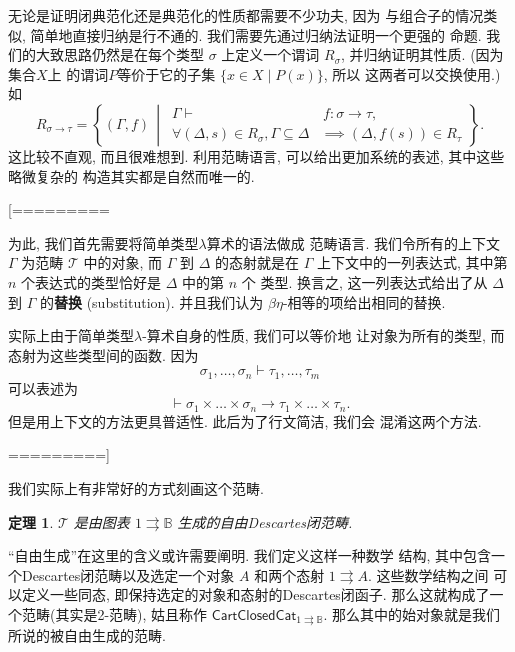 \documentclass[UTF8]{ctexbook}
\theoremstyle{plain}
\newtheorem{theorem}{定理}[chapter]
\theoremstyle{definition}
\theoremstyle{remark}
\begin{document}
无论是证明闭典范化还是典范化的性质都需要不少功夫, 因为
与组合子的情况类似, 简单地直接归纳是行不通的.
我们需要先通过归纳法证明一个更强的
命题. 我们的大致思路仍然是在每个类型 \(\sigma\) 上定义一个谓词
\(R_\sigma\), 并归纳证明其性质. (因为集合\(X\)上
的谓词\(P\)等价于它的子集 \(\{x\in X\mid P(x)\}\), 所以
这两者可以交换使用.) 如
\[R_{\sigma \to \tau} = \left\{(\Gamma, f) \,\middle|\,
\begin{aligned}
\Gamma \vdash&\, f:\sigma\to\tau, \\ \forall (\Delta, s) \in R_\sigma, \Gamma \subseteq \Delta &\implies (\Delta, f(s)) \in R_\tau
\end{aligned}
\right\}.\]
这比较不直观, 而且很难想到.
利用范畴语言, 可以给出更加系统的表述, 其中这些略微复杂的
构造其实都是自然而唯一的.

[=========

为此, 我们首先需要将简单类型\(\lambda\)算术的语法做成
范畴语言. 我们令所有的上下文 \(\Gamma\) 为范畴
\(\mathcal T\) 中的对象, 而 \(\Gamma\) 到 \(\Delta\)
的态射就是在 \(\Gamma\) 上下文中的一列表达式, 其中第
\(n\) 个表达式的类型恰好是 \(\Delta\) 中的第 \(n\) 个
类型. 换言之, 这一列表达式给出了从 \(\Delta\) 到 \(\Gamma\)
的\textbf{替换} (substitution). 并且我们认为
\(\beta\eta\)-相等的项给出相同的替换.

实际上由于简单类型\(\lambda\)-算术自身的性质, 我们可以等价地
让对象为所有的类型, 而态射为这些类型间的函数. 因为
\[\sigma_1,\dots,\sigma_n \vdash \tau_1,\dots,\tau_m\]
可以表述为
\[\vdash \sigma_1\times\dots\times\sigma_n \to \tau_1 \times\dots\times\tau_n.\]
但是用上下文的方法更具普适性. 此后为了行文简洁, 我们会
混淆这两个方法.

=========]

我们实际上有非常好的方式刻画这个范畴.
\begin{theorem}
\(\mathcal T\) 是由图表 \(1 \rightrightarrows \mathbb B\)
生成的自由Descartes闭范畴.
\end{theorem}
``自由生成''在这里的含义或许需要阐明. 我们定义这样一种数学
结构, 其中包含一个Descartes闭范畴以及选定一个对象 \(A\)
和两个态射 \(1\rightrightarrows A\). 这些数学结构之间
可以定义一些同态, 即保持选定的对象和态射的Descartes闭函子.
那么这就构成了一个范畴(其实是2-范畴), 姑且称作
\(\mathsf{CartClosedCat}_{1\rightrightarrows\mathbb B}\).
那么其中的始对象就是我们所说的被自由生成的范畴.
\end{document}
